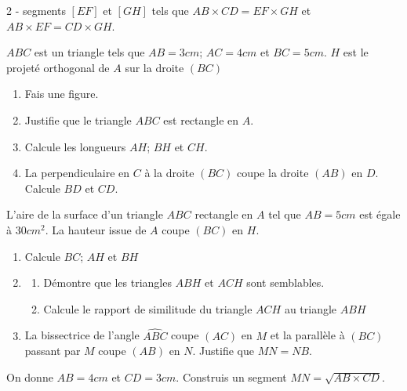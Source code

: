 \begin{multicols}{2}
{  		- segments $[EF]$ et $[GH]$ tels que $AB\times CD= EF\times GH$ et $AB\times EF= CD\times GH$. 
  	}
  	\begin{center}
  	\end{center}
  	\begin{center}
  	\end{center}
  	
  	$ABC$ est un triangle tels que $AB=3cm$; $AC=4cm$ et $BC=5cm$. $H$ est le projeté orthogonal de $A$ sur la droite $(BC)$ 
  	\begin{enumerate}
  		\item Fais une figure.
  		\item  Justifie que le triangle $ABC$ est rectangle en $A$.
  		\item  Calcule les longueurs $AH$; $BH$ et $CH$.
  		\item  La perpendiculaire en $C$ à la droite $(BC)$ coupe la droite $(AB)$ en $D$. Calcule $BD$ et $CD$.
  	\end{enumerate}
  	\begin{center}
  	\end{center}
  	
  	L'aire de la surface d'un triangle $ABC$ rectangle en $A$ tel que $AB=5cm$ est égale à $30 cm^2$. La hauteur issue de $A$ coupe $(BC)$ en $H$. 
  	
  	\begin{enumerate}
  		\item  Calcule $BC$; $AH$ et $BH$
  		\item  
  		\begin{enumerate}
  			\item  Démontre que les triangles $ABH$ et $ACH$ sont semblables.
  			\item  Calcule le rapport de similitude du triangle $ACH$  au triangle $ABH$
  		\end{enumerate}
  		\item  La bissectrice de l'angle $\widehat{ABC}$ coupe $(AC)$ en $M$ et la parallèle à $(BC)$ passant par $M$ coupe $(AB)$ en $N$. Justifie que $MN=NB$.
  	\end{enumerate}
  	
  	\begin{center}
  	\end{center}
  	On donne $AB=4cm$ et $CD=3cm$. Construis un segment $MN=\sqrt{AB\times CD}$.
  	\setcounter{q}{0}
  	

\end{multicols}

